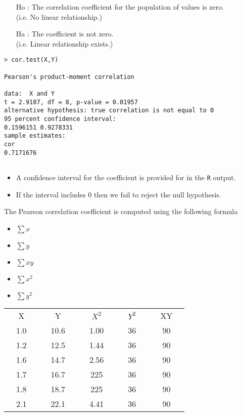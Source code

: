 \begin{itemize}
\item[Ho] : The correlation coefficient for the population of values is zero. \\(i.e. No linear relationship.)
\item[Ha] : The coefficient is not zero. \\ (i.e. Linear relationship exists.)
\end{itemize}
{

\begin{framed}
\begin{verbatim}
> cor.test(X,Y)

Pearson's product-moment correlation

data:  X and Y
t = 2.9107, df = 8, p-value = 0.01957
alternative hypothesis: true correlation is not equal to 0
95 percent confidence interval:
0.1596151 0.9278331
sample estimates:
cor 
0.7171676 


\end{verbatim}
\end{framed}
}

\begin{itemize}
\item A confidence interval for the coefficient is provided for in the \texttt{R} output. 
\item If the interval includes 0 then we fail to reject the null hypothesis.
\end{itemize}



The Pearson correlation coefficient is computed using the
following formula

\begin{multicols}{2}
\begin{itemize}
\item $\sum x$ \item $\sum y$ \item $\sum xy$ \item $\sum x^2$
\item $\sum y^2$
\end{itemize}

\end{multicols}

\begin{center}
\begin{tabular}{|ccc|ccc|ccc|ccc|ccc|}
\hline
& X & & & Y & & &  $X^2$ & & &  $Y^2$ & & &  XY & \\
& 1.0 & & & 10.6 & & &  1.00 & & &  36 & & &  90 & \\ \hline
& 1.2 & & & 12.5 & & &  1.44 & & &  36 & & &  90 & \\ \hline
& 1.6 & & & 14.7 & & &  2.56 & & &  36 & & &  90 & \\ \hline
& 1.7 & & & 16.7 & & &  225 & & &  36 & & &  90 & \\ \hline
& 1.8 & & & 18.7 & & &  225 & & &  36 & & &  90 & \\ \hline
& 2.1 & & & 22.1 & & &  4.41 & & &  36 & & &  90 & \\ \hline


\end{tabular}
\end{center}

